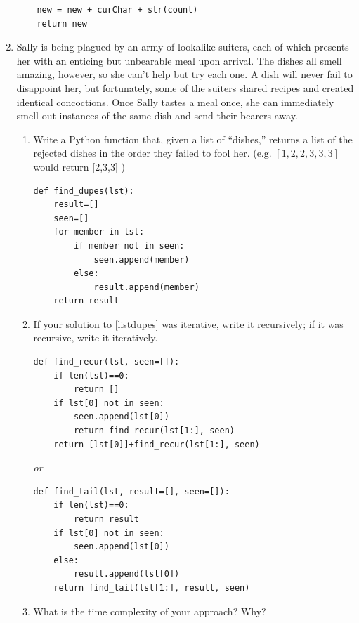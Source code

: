 \documentclass[11pt]{article}
\newenvironment{answer}{\large\lstset{basicstyle=\large}\color{white}}{}
\newenvironment{answer}{\large\lstset{basicstyle=\large}\color{red}}{}
\begin{document}
\begin{enumerate}
\begin{answer}
\begin{lstlisting}
    new = new + curChar + str(count)
    return new
\end{lstlisting}
\end{answer}

\newpage


\newpage
\item
Sally is being plagued by an army of lookalike suiters, each of which presents her with an enticing but unbearable meal upon arrival.
The dishes all smell amazing, however, so she can't help but try each one.
A dish will never fail to disappoint her, but fortunately, some of the suiters shared recipes and created identical concoctions.
Once Sally tastes a meal once, she can immediately smell out instances of the same dish and send their bearers away.
\begin{enumerate}
\item
\label{listdupes}
Write a Python function that, given a list of ``dishes,'' returns a list of the rejected dishes in the order they failed to fool her. (e.g. $[1, 2, 2, 3, 3, 3]$ would return [2,3,3] )
\begin{answer}
\begin{lstlisting}
def find_dupes(lst):
	result=[]
	seen=[]
	for member in lst:
		if member not in seen:
			seen.append(member)
		else:
			result.append(member)
	return result
\end{lstlisting}
\end{answer}

\item
If your solution to \ref{listdupes} was iterative, write it recursively; if it was recursive, write it iteratively.
\begin{answer}
\begin{lstlisting}
def find_recur(lst, seen=[]):
	if len(lst)==0:
		return []
	if lst[0] not in seen:
		seen.append(lst[0])
		return find_recur(lst[1:], seen)
	return [lst[0]]+find_recur(lst[1:], seen)
\end{lstlisting}
\textit{or}
\begin{lstlisting}
def find_tail(lst, result=[], seen=[]):
	if len(lst)==0:
		return result
	if lst[0] not in seen:
		seen.append(lst[0])
	else:
		result.append(lst[0])
	return find_tail(lst[1:], result, seen)
\end{lstlisting}
\end{answer}

\item
What is the time complexity of your approach?
Why? \\


\end{enumerate}
\end{enumerate}
\end{document}
